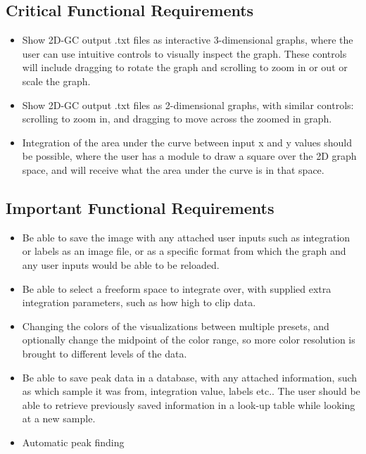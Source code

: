 \documentclass{article}
\begin{document}
\subsection*{Critical Functional Requirements}
\begin{itemize}
	\item Show 2D-GC output .txt files as interactive 3-dimensional graphs, where the user can use intuitive controls to visually inspect the graph. These controls will include dragging to rotate the graph and scrolling to zoom in or out or scale the graph.
	\item Show 2D-GC output .txt files as 2-dimensional graphs, with similar controls: scrolling to zoom in, and dragging to move across the zoomed in graph. 
    \item Integration of the area under the curve between input x and y values should be possible, where the user has a module to draw a square over the 2D graph space, and will receive what the area under the curve is in that space. 
\end{itemize}

\subsection*{Important Functional Requirements}
\begin{itemize}
    \item Be able to save the image with any attached user inputs such as integration or labels as an image file, or as a specific format from which the graph and any user inputs would be able to be reloaded. 
	\item Be able to select a freeform space to integrate over, with supplied extra integration parameters, such as how high to clip data.
	\item Changing the colors of the visualizations between multiple presets, and optionally change the midpoint of the color range, so more color resolution is brought to different levels of the data. 
    \item Be able to save peak data in a database, with any attached information, such as which sample it was from, integration value, labels etc.. The user should be able to retrieve previously saved information in a look-up table while looking at a new sample.
	\item Automatic peak finding
\end{itemize}
\end{document}

